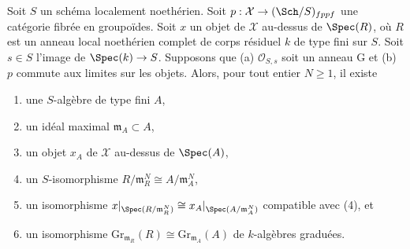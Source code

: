 \begin{lemma}
\label{lemma-approximate}
Soit $S$ un schéma localement noethérien. Soit
$p : \mathcal{X} \to (\Sch/S)_{fppf}$ une catégorie
fibrée en groupoïdes. Soit $x$ un objet de
$\mathcal{X}$ au-dessus de $\Spec(R)$, où $R$ est un anneau local noethérien complet
de corps résiduel $k$ de type fini sur $S$. Soit $s \in S$
l'image de $\Spec(k) \to S$. Supposons que (a) $\mathcal{O}_{S, s}$ soit
un anneau G et (b) $p$ commute aux limites sur les objets. Alors, pour tout
entier $N \geq 1$, il existe
\begin{enumerate}
\item une $S$-algèbre de type fini $A$,
\item un idéal maximal $\mathfrak m_A \subset A$,
\item un objet $x_A$ de $\mathcal{X}$ au-dessus de $\Spec(A)$,
\item un $S$-isomorphisme $R/\mathfrak m_R^N \cong A/\mathfrak m_A^N$,
\item un isomorphisme
$x|_{\Spec(R/\mathfrak m_R^N)} \cong x_A|_{\Spec(A/\mathfrak m_A^N)}$
compatible avec (4), et
\item un isomorphisme
$\text{Gr}_{\mathfrak m_R}(R) \cong \text{Gr}_{\mathfrak m_A}(A)$
de $k$-algèbres graduées.
\end{enumerate}
\end{lemma}

